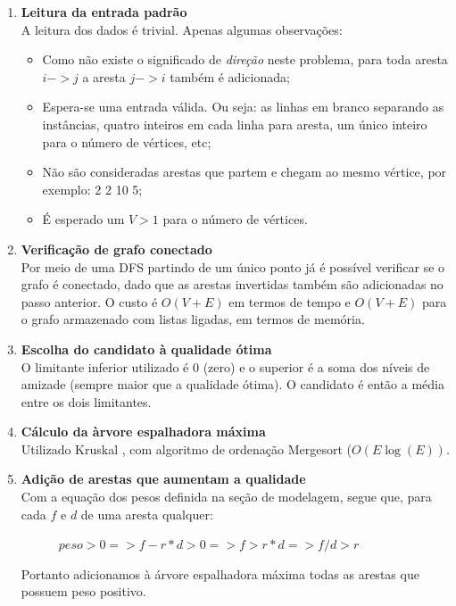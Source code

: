 \documentclass[a4paper,12pt,titlepage]{article}
\begin{document}
\begin{enumerate}
\item\textbf{Leitura da entrada padrão} \\
A leitura dos dados é trivial. Apenas algumas observações: \begin{itemize} 
    \item Como não existe o significado de \textit{direção} neste problema, para toda aresta $i->j$ a aresta $j->i$ também é adicionada;
    \item Espera-se uma entrada válida. Ou seja: as linhas em branco separando as instâncias, quatro inteiros em cada linha para aresta, um único inteiro para o número de vértices, etc;
    \item Não são consideradas arestas que partem e chegam ao mesmo vértice, por exemplo: 2 2 10 5;
    \item É esperado um $V > 1$ para o número de vértices.
\end{itemize}

\item\textbf{Verificação de grafo conectado} \\
Por meio de uma DFS partindo de um único ponto já é possível verificar se o grafo é conectado, dado que as arestas invertidas também são adicionadas no passo anterior. O custo é $O(V + E)$ em termos de tempo e $O(V + E)$ para o grafo armazenado com listas ligadas, em termos de memória.

\item\textbf{Escolha do candidato à qualidade ótima} \\
O limitante inferior utilizado é 0 (zero) e o superior é a soma dos níveis de amizade (sempre maior que a qualidade ótima). O candidato é então a média entre os dois limitantes.

\item\textbf{Cálculo da àrvore espalhadora máxima} \\
Utilizado Kruskal \cite{cormen}, com algoritmo de ordenação Mergesort ($O(E\log(E))$.

\item\textbf{Adição de arestas que aumentam a qualidade} \\
Com a equação dos pesos definida na seção de modelagem, segue que, para cada $f$ e $d$ de uma aresta qualquer:

\ \ \ \ \ \ $ peso > 0  =>  f - r*d > 0  =>  f > r*d   =>  f/d > r $

Portanto adicionamos à árvore espalhadora máxima todas as arestas que possuem peso positivo.


\end{enumerate}
\end{document}
